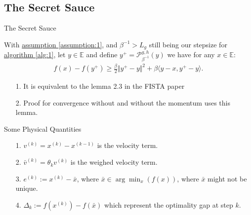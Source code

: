 \documentclass[11pt]{beamer}
\begin{document}
    \subsection{The Secret Sauce}
        \begin{frame}{The Secret Sauce}
            \begin{lemma}\label{lemma:prox_two_p}
                With \hyperref[assumption:1]{assumption \ref*{assumption:1}}, and $\beta^{-1} > L_g$ still being our stepsize for \hyperref[alg:1]{algorithm \ref*{alg:1}}, let $y\in \mathbb E$ and define $y^+ = \mathcal P_{\beta^{-1}}^{g, h}(y)$ we have for any $x\in \mathbb E$: 
                \begin{align*}
                    f(x) - f(y^+) \ge \frac{\beta}{2}\Vert y^+ - y\Vert^2 + 
                    \beta \langle y - x, y^+ - y\rangle. 
                \end{align*}
            \end{lemma}
            \begin{itemize}
                \item [1.] It is equivalent to the lemma 2.3 in the FISTA paper\cite{paper:FISTA}
                \pause \item [2.] Proof for convergence without and without the momentum uses this lemma. 
            \end{itemize}
        \end{frame}
        \begin{frame}{Some Physical Quantities}
            \begin{itemize}
                \item [1.] $v^{(k)} = x^{(k)} - x^{(k -1)}$ is the velocity term. 
                \pause\item [2.] $\bar v^{(k)}= \theta_k v^{(k)}$ is the weighed velocity term. 
                \pause\item [3.] $e^{(k)} := x^{(k)} - \bar x$, where $\bar x \in \arg\min_{x}(f(x))$, where $\bar x$ might not be unique. 
                \pause\item [4.] $\Delta_k := f(x^{(k)}) - f(\bar x)$ which represent the optimality gap at step $k$. 
            \end{itemize}
        \end{frame}
\end{document}
